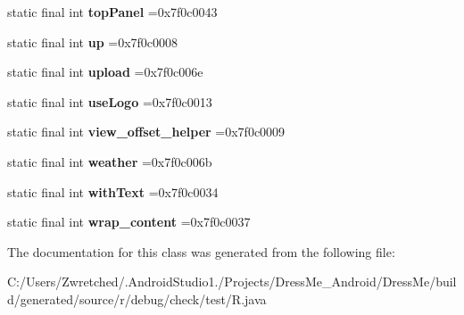 \begin{DoxyCompactItemize}
\item 
\hypertarget{classcheck_1_1test_1_1_r_1_1id_ad0d7328f822ffbc8e5e4f5d0cbfd6c9b}{}static final int {\bfseries top\+Panel} =0x7f0c0043\label{classcheck_1_1test_1_1_r_1_1id_ad0d7328f822ffbc8e5e4f5d0cbfd6c9b}

\item 
\hypertarget{classcheck_1_1test_1_1_r_1_1id_a1ad083411c099a92474d9da49e8efebe}{}static final int {\bfseries up} =0x7f0c0008\label{classcheck_1_1test_1_1_r_1_1id_a1ad083411c099a92474d9da49e8efebe}

\item 
\hypertarget{classcheck_1_1test_1_1_r_1_1id_ae4631fbbe86141d9c87bbcbb260ff34b}{}static final int {\bfseries upload} =0x7f0c006e\label{classcheck_1_1test_1_1_r_1_1id_ae4631fbbe86141d9c87bbcbb260ff34b}

\item 
\hypertarget{classcheck_1_1test_1_1_r_1_1id_a4587012d77ca2319bb52864458dd53cc}{}static final int {\bfseries use\+Logo} =0x7f0c0013\label{classcheck_1_1test_1_1_r_1_1id_a4587012d77ca2319bb52864458dd53cc}

\item 
\hypertarget{classcheck_1_1test_1_1_r_1_1id_a9ad0b1af436614ea93630e231bbc28ff}{}static final int {\bfseries view\+\_\+offset\+\_\+helper} =0x7f0c0009\label{classcheck_1_1test_1_1_r_1_1id_a9ad0b1af436614ea93630e231bbc28ff}

\item 
\hypertarget{classcheck_1_1test_1_1_r_1_1id_a3dc69afb622c2b786a3c150088261292}{}static final int {\bfseries weather} =0x7f0c006b\label{classcheck_1_1test_1_1_r_1_1id_a3dc69afb622c2b786a3c150088261292}

\item 
\hypertarget{classcheck_1_1test_1_1_r_1_1id_a6c8121872834b364de9ec0c1b858d30c}{}static final int {\bfseries with\+Text} =0x7f0c0034\label{classcheck_1_1test_1_1_r_1_1id_a6c8121872834b364de9ec0c1b858d30c}

\item 
\hypertarget{classcheck_1_1test_1_1_r_1_1id_aebcfb6a3b83a26f94745bf11ba7581b2}{}static final int {\bfseries wrap\+\_\+content} =0x7f0c0037\label{classcheck_1_1test_1_1_r_1_1id_aebcfb6a3b83a26f94745bf11ba7581b2}

\end{DoxyCompactItemize}


The documentation for this class was generated from the following file\+:\begin{DoxyCompactItemize}
\item 
C\+:/\+Users/\+Zwretched/.\+Android\+Studio1./\+Projects/\+Dress\+Me\+\_\+\+Android/\+Dress\+Me/build/generated/source/r/debug/check/test/R.\+java\end{DoxyCompactItemize}
